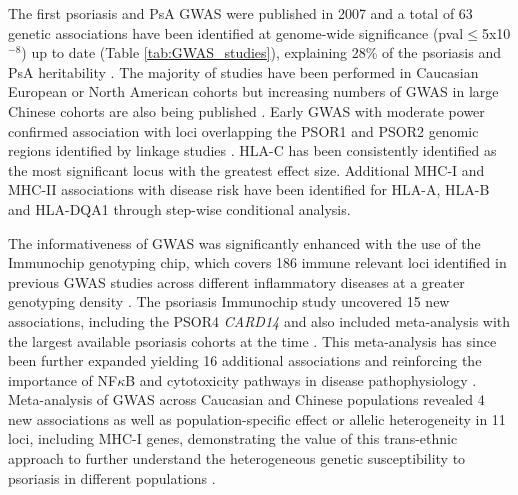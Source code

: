 
The first psoriasis and PsA GWAS were published in 2007 and a total of 63 genetic associations have been identified at genome-wide significance (pval$\leq$5x10$^{-8}$) up to date (Table \ref{tab:GWAS_studies}), explaining 28\% of the psoriasis and PsA heritability  \parencite{Tsoi2017}. The majority of studies have been performed in Caucasian European or North American cohorts but increasing numbers of GWAS in large Chinese cohorts are also being published \parencite{Zhang2009, Sun2010, Yin2015}. Early GWAS with moderate power confirmed association with loci overlapping the PSOR1 and PSOR2 genomic regions identified by linkage studies \parencite{Cargill2007,Strange2010}. HLA-C has been consistently identified as the most significant locus with the greatest effect size. Additional MHC-I and MHC-II associations with disease risk have been identified for HLA-A, HLA-B and HLA-DQA1 through step-wise conditional analysis\parencite{Okada2014}. 

The informativeness of GWAS was significantly enhanced with the use of the Immunochip genotyping chip, which covers 186 immune relevant loci identified in previous GWAS studies across different inflammatory diseases at a greater genotyping density \parencite{Tsoi2012}. The psoriasis Immunochip study uncovered 15 new associations, including the PSOR4 \textit{CARD14} and also included meta-analysis with the largest available psoriasis cohorts at the time \parencite{Tsoi2012}. This meta-analysis has since been further expanded yielding 16 additional associations and reinforcing the importance of NF$\kappa$B and cytotoxicity pathways in disease pathophysiology \parencite{Tsoi2015,Tsoi2017}. Meta-analysis of GWAS across Caucasian and Chinese populations revealed 4 new associations as well as population-specific effect or allelic heterogeneity in 11 loci, including MHC-I genes, demonstrating the value of this trans-ethnic approach to further understand the heterogeneous genetic susceptibility to psoriasis in different populations \parencite{Yin2015}. 

